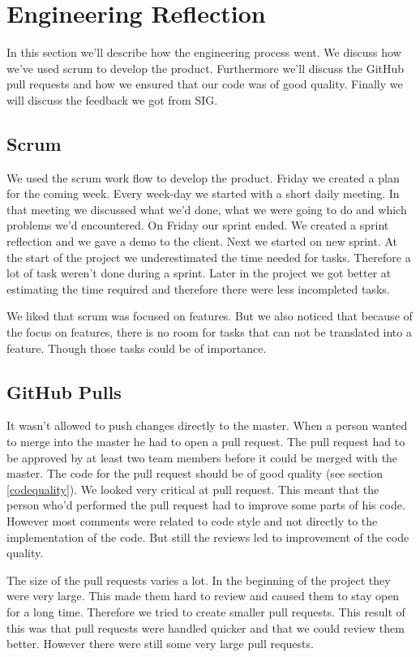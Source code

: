 \chapter{Engineering Reflection} %

In this section we'll describe how the engineering process went. We discuss how we've used scrum to develop the product. Furthermore we'll discuss the GitHub pull requests and how we ensured that our code was of good quality. Finally we will discuss the feedback we got from SIG.

\section{Scrum}
We used the scrum work flow to develop the product. Friday we created a plan for the coming week. Every week-day we started with a short daily meeting. In that meeting we discussed what we'd done, what we were going to do and which problems we'd encountered. On Friday our sprint ended. We created a sprint reflection and we gave a demo to the client. Next we started on new sprint. 
At the start of the project we underestimated the time needed for tasks. Therefore a lot of task weren't done during a sprint. Later in the project we got better at estimating the time required and therefore there were less incompleted tasks.

We liked that scrum was focused on features. But we also noticed that because of the focus on features, there is no room for tasks that can not be translated into a feature. Though those tasks could be of importance.

\section{GitHub Pulls}
It wasn't allowed to push changes directly to the master. When a person wanted to merge into the master he had to open a pull request. The pull request had to be approved by at least two team members before it could be merged with the master. The code for the pull request should be of good quality (see section \ref{codequality}).  We looked very critical at pull request. This meant that the person who'd performed the pull request had to improve some parts of his code. However most comments were related to code style and not directly to the implementation of the code. But still the reviews led to improvement of the code quality. 

The size of the pull requests varies a lot. In the beginning of the project they were very large. This made them hard to review and caused them to stay open for a long time. Therefore we tried to create smaller pull requests. This result of this was that pull requests were handled quicker and that we could review them better. However there were still some very large pull requests.

